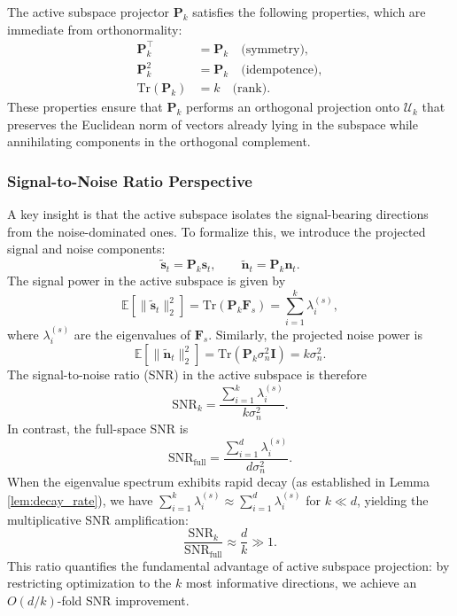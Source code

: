 ﻿\documentclass[lettersize,journal]{IEEEtran}
\begin{document}
The active subspace projector $\mathbf{P}_k$ satisfies the following properties, which are immediate from orthonormality:
\begin{align}
\label{eq:projector_properties}
\mathbf{P}_k^\top &= \mathbf{P}_k \quad \text{(symmetry)}, \\
\mathbf{P}_k^2 &= \mathbf{P}_k \quad \text{(idempotence)}, \\
\text{Tr}(\mathbf{P}_k) &= k \quad \text{(rank)}.
\end{align}
These properties ensure that $\mathbf{P}_k$ performs an orthogonal projection onto $\mathcal{U}_k$ that preserves the Euclidean norm of vectors already lying in the subspace while annihilating components in the orthogonal complement.

\subsubsection{Signal-to-Noise Ratio Perspective}

A key insight is that the active subspace isolates the signal-bearing directions from the noise-dominated ones. To formalize this, we introduce the projected signal and noise components:
\begin{equation}
\label{eq:projected_signal_noise}
\tilde{\mathbf{s}}_t = \mathbf{P}_k \mathbf{s}_t, \qquad \tilde{\mathbf{n}}_t = \mathbf{P}_k \mathbf{n}_t.
\end{equation}
The signal power in the active subspace is given by
\begin{equation}
\label{eq:signal_power}
\mathbb{E}\left[\|\tilde{\mathbf{s}}_t\|_2^2\right] = \text{Tr}(\mathbf{P}_k \mathbf{F}_s) = \sum_{i=1}^{k} \lambda_i^{(s)},
\end{equation}
where $\lambda_i^{(s)}$ are the eigenvalues of $\mathbf{F}_s$. Similarly, the projected noise power is
\begin{equation}
\label{eq:noise_power}
\mathbb{E}\left[\|\tilde{\mathbf{n}}_t\|_2^2\right] = \text{Tr}(\mathbf{P}_k \sigma_n^2 \mathbf{I}) = k \sigma_n^2.
\end{equation}
The signal-to-noise ratio (SNR) in the active subspace is therefore
\begin{equation}
\label{eq:snr_active}
\text{SNR}_k = \frac{\sum_{i=1}^{k} \lambda_i^{(s)}}{k \sigma_n^2}.
\end{equation}
In contrast, the full-space SNR is
\begin{equation}
\label{eq:snr_full}
\text{SNR}_{\text{full}} = \frac{\sum_{i=1}^{d} \lambda_i^{(s)}}{d \sigma_n^2}.
\end{equation}
When the eigenvalue spectrum exhibits rapid decay (as established in Lemma \ref{lem:decay_rate}), we have $\sum_{i=1}^{k} \lambda_i^{(s)} \approx \sum_{i=1}^{d} \lambda_i^{(s)}$ for $k \ll d$, yielding the multiplicative SNR amplification:
\begin{equation}
\label{eq:snr_amplification}
\frac{\text{SNR}_k}{\text{SNR}_{\text{full}}} \approx \frac{d}{k} \gg 1.
\end{equation}
This ratio quantifies the fundamental advantage of active subspace projection: by restricting optimization to the $k$ most informative directions, we achieve an $O(d/k)$-fold SNR improvement.
\end{document}
